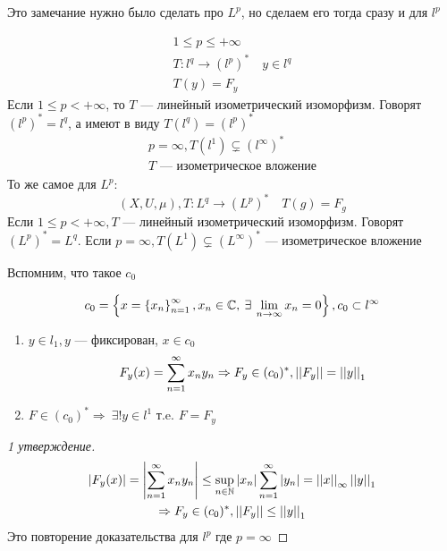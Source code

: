 \documentclass[document]{subfiles}
\begin{document}
Это замечание нужно было сделать про $L^p$, но сделаем  его тогда сразу и для $l^p$
\begin{remark}
    \begin{gather*}
        1 \leq p \leq +\infty \\
        T: l^q \rightarrow (l^p)^* \quad y \in l^q \\
        T(y) = F_y
    \end{gather*}
    Если $1 \leq p < + \infty$, то $T$ --- линейный изометрический изоморфизм. Говорят $(l^p)^* = l^q$, а имеют в виду $T(l^q) = (l^p)^*$
    \begin{gather*}
        p = \infty, T(l^1) \subsetneq (l^\infty)^* \\
        T \text{ --- изометрическое вложение}
    \end{gather*}
    То же самое для $L^p$:
        \[ (X, U, \mu), T: L^q \rightarrow (L^p)^* \quad T(g) = F_g \]
        Если $1 \leq p < +\infty, T$ --- линейный изометрический изоморфизм. Говорят $(L^p)^* = L^q$. Если $p = \infty, T(L^1) \subsetneq (L^\infty)^*$ --- 
        изометрическое вложение
\end{remark}

Вспомним, что такое $c_0$

\begin{theorem}[сопряжённое к $c_0$]
    \[ c_0 = \seq{ x = \seq{x_n}^\infty_{n=1}, x_n \in \bC, \: \exists \liml_{n \to \infty} x_n = 0}, c_0 \subset l^\infty \]
    \begin{enumerate}
        \item $y \in l_1, y$  --- фиксирован, $x \in c_0$ \[
            F_y(x) = \sum^\infty_{n=1} x_n y_n \Rightarrow F_y \in (c_0)^*, \left|\left| {F_y} \right| \right| = \left|\left| {y} \right| \right|_1 \]
        \item $F \in (c_0)^* \Rightarrow \: \exists! y \in l^1 \text{ т.e. } F = F_y $
    \end{enumerate}
\end{theorem}

\begin{proof}[1 утверждение]
    \begin{gather*}
        \left| {F_y(x)} \right| = \left| {\sum^\infty_{n=1} x_n y_n} \right| \leq \sup_{n \in \mathbb{N}} \left| {x_n} \right| \sum^\infty_{n=1} \left| {y_n} \right| = \left|\left| {x} \right| \right|_\infty \left|\left| {y} \right| \right|_1 \\
        \Rightarrow F_y \in (c_0)^*,  \left|\left| {F_y} \right| \right| \leq \left|\left| {y} \right| \right|_1
    \end{gather*}
    Это повторение доказательства для $l^p$ где $p=\infty$
\end{proof}
\end{document}
